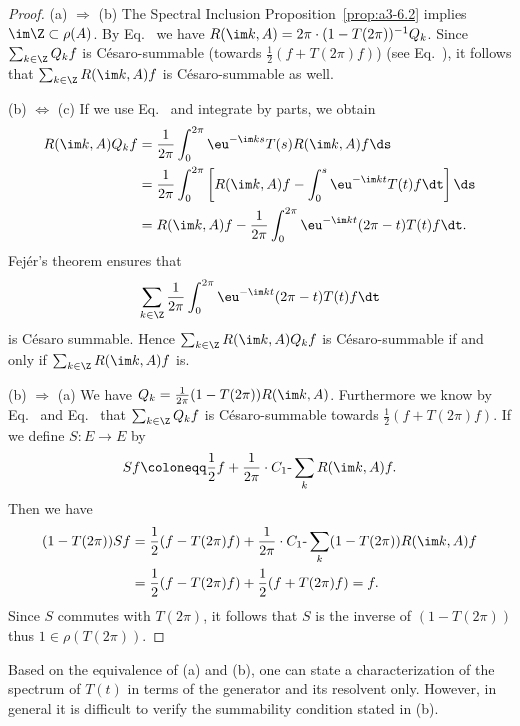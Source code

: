 \begin{proof}
(a) $\Rightarrow$ (b) The Spectral Inclusion Proposition~\ref{prop:a3-6.2} implies $\im\Z \subset \rho(A)$.
By Eq.~ we have $R(\im k,A) = 2\pi\cdot(1-T(2\pi))^{-1}Q_{k}$.
Since $\sum_{k\in\Z} Q_{k}f$ is Césaro-summable (\mbox{towards} $\frac{1}{2}(f + T(2\pi)f)$) (see Eq.~), it follows that $\sum_{k\in\Z} R(\im k,A)f$ is Césaro-summable as well.

(b) $\Leftrightarrow$ (c) If we use Eq.~ and integrate by parts, we obtain
\begin{align*}
R(\im k,A)Q_{k}f &= \frac{1}{2\pi}\int_{0}^{2\pi} \eu^{-\im ks} T(s)R(\im k,A)f \ds \\
&= \frac{1}{2\pi}\int_{0}^{2\pi} \left[R(\im k,A)f - \int_{0}^{s} \eu^{-\im kt} T(t)f \dt\right] \ds \\
&= R(\im k,A)f - \frac{1}{2\pi}\int_{0}^{2\pi} \eu^{-\im kt} (2\pi-t) T(t)f \dt .
\end{align*}
Fejér's theorem ensures that 
%
\[
	 \sum_{k\in\Z} \frac{1}{2\pi}\int_{0}^{2\pi} \eu^{-\im kt} (2\pi-t) T(t)f \dt 
\]
%
is Césaro summable.
Hence $\sum_{k\in\Z} R(\im k,A)Q_{k}f$ is Césaro-summable if and only if\/ $\sum_{k\in\Z} R(\im k,A)f$ is.

(b) $\Rightarrow$ (a) We have $Q_{k} = \frac{1}{2\pi}(1 - T(2\pi))R(\im k,A)$.
Furthermore we know by Eq.~ and Eq.~  that $\sum_{k\in\Z} Q_{k}f$ is Césaro-summable towards $\frac{1}{2}(f + T(2\pi)f)$.
If we define $S \colon E \to E$ by 
%
\[
	Sf \coloneqq \frac{1}{2}f + \frac{1}{2\pi}\cdot C_{1}\text{-}\sum_k R(\im k,A)f .
\]
%
Then we have
\begin{align*}
(1 - T(2\pi))Sf &= \frac{1}{2}(f - T(2\pi)f) + \frac{1}{2\pi}\cdot C_{1}\text{-}\sum_k (1 - T(2\pi))R(\im k,A)f \\
&= \frac{1}{2}(f - T(2\pi)f) + \frac{1}{2}(f + T(2\pi)f) = f .
\end{align*}
Since $S$ commutes with $T(2\pi)$, it follows that $S$ is the inverse of\/ $(1 - T(2\pi))$ thus $1 \in \rho(T(2\pi))$.
\end{proof}
Based on the equivalence of (a) and (b), one can state a characterization of the spectrum of\/ $T(t)$ in terms of the generator and its resolvent only.
However, in general it is difficult to verify the summability condition stated in (b).


